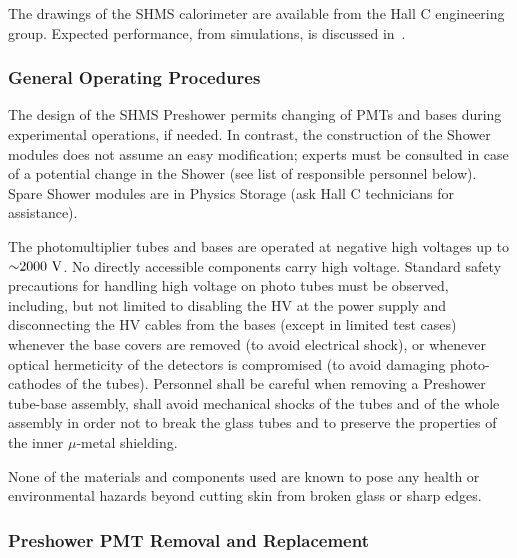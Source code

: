 {The drawings of the SHMS calorimeter are available from the Hall C
engineering group.  Expected performance, from simulations, is discussed
in~\cite{Mkrtchyan201385}.





\subsubsection{General Operating Procedures}
The design of the SHMS Preshower permits changing of PMTs and bases during
experimental operations, if needed. In contrast, the construction of the
Shower modules does not assume an easy modification; experts must be
consulted in case of a potential change in the Shower (see list of
responsible personnel below). Spare Shower modules are in Physics
Storage (ask Hall C technicians for assistance).

The photomultiplier tubes and bases are operated at negative high
voltages up to $\mathord{\sim} 2000~\textrm{V}$. No directly accessible
components carry high voltage. Standard safety precautions for
handling high voltage on photo tubes must be observed, including, but
not limited to disabling the HV at the power supply and disconnecting
the HV cables from the bases (except in limited test cases) whenever
the base covers are removed (to avoid electrical shock), or whenever
optical hermeticity of the detectors is compromised (to avoid damaging
photo-cathodes of the tubes). Personnel shall be careful when
removing a Preshower tube-base assembly, shall avoid mechanical shocks
of the tubes and of the whole assembly in order not to break the glass
tubes and to preserve the properties of the inner $\mu$-metal
shielding.

None of the materials and components used are known to pose any health
or environmental hazards beyond cutting skin from broken glass or
sharp edges.

\subsubsection{Preshower PMT Removal and Replacement}
}
